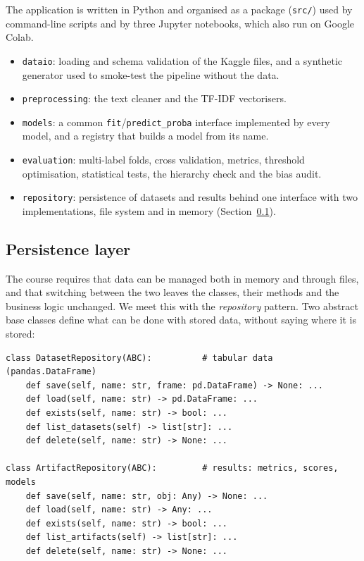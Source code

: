 \documentclass[11pt,a4paper]{article}
\begin{document}
The application is written in Python and organised as a package
(\texttt{src/}) used by command-line scripts and by three Jupyter notebooks,
which also run on Google Colab.

\begin{itemize}
  \item \texttt{dataio}: loading and schema validation of the Kaggle files, and
        a synthetic generator used to smoke-test the pipeline without the data.
  \item \texttt{preprocessing}: the text cleaner and the TF-IDF vectorisers.
  \item \texttt{models}: a common \texttt{fit}/\texttt{predict\_proba}
        interface implemented by every model, and a registry that builds a
        model from its name.
  \item \texttt{evaluation}: multi-label folds, cross validation, metrics,
        threshold optimisation, statistical tests, the hierarchy check and the
        bias audit.
  \item \texttt{repository}: persistence of datasets and results behind one
        interface with two implementations, file system and in memory
        (Section~\ref{sec:persistence}).
\end{itemize}

\subsection{Persistence layer}
\label{sec:persistence}

The course requires that data can be managed both in memory and through files,
and that switching between the two leaves the classes, their methods and the
business logic unchanged.  We meet this with the \emph{repository} pattern.
Two abstract base classes define what can be done with stored data, without
saying where it is stored:

\begin{lstlisting}
class DatasetRepository(ABC):          # tabular data (pandas.DataFrame)
    def save(self, name: str, frame: pd.DataFrame) -> None: ...
    def load(self, name: str) -> pd.DataFrame: ...
    def exists(self, name: str) -> bool: ...
    def list_datasets(self) -> list[str]: ...
    def delete(self, name: str) -> None: ...

class ArtifactRepository(ABC):         # results: metrics, scores, models
    def save(self, name: str, obj: Any) -> None: ...
    def load(self, name: str) -> Any: ...
    def exists(self, name: str) -> bool: ...
    def list_artifacts(self) -> list[str]: ...
    def delete(self, name: str) -> None: ...
\end{lstlisting}
\end{document}
